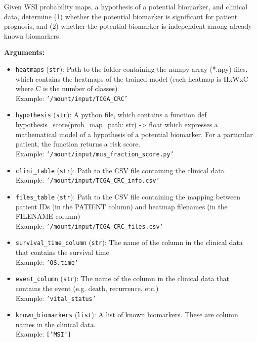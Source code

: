 \begin{tcolorbox}[title={\texttt{pathfinder\_verify\_biomarker}}]
Given WSI probability maps, a hypothesis of a potential biomarker, and clinical data, determine (1) whether the potential biomarker is significant for patient prognosis, and (2) whether the potential biomarker is independent among already known biomarkers.

\vspace{.5em}
\textbf{Arguments:}
\begin{itemize}[topsep=0pt,parsep=-1pt,partopsep=0pt]
\item \texttt{heatmaps} (\texttt{str}): Path to the folder containing the numpy array (\textasciigrave{}*.npy\textasciigrave{}) files, which contains the heatmaps of the trained model (each heatmap is HxWxC where C is the number of classes)\\  Example: \texttt{'/mount/input/TCGA\_CRC'}
\item \texttt{hypothesis} (\texttt{str}): A python file, which contains a function \textasciigrave{}def hypothesis\_score(prob\_map\_path: str) -\textgreater{} float\textasciigrave{} which expresses a mathematical model of a hypothesis of a potential biomarker.  For a particular patient, the function returns a risk score.\\  Example: \texttt{'/mount/input/mus\_fraction\_score.py'}
\item \texttt{clini\_table} (\texttt{str}): Path to the CSV file containing the clinical data\\  Example: \texttt{'/mount/input/TCGA\_CRC\_info.csv'}
\item \texttt{files\_table} (\texttt{str}): Path to the CSV file containing the mapping between patient IDs (in the PATIENT column) and heatmap filenames (in the FILENAME column)\\  Example: \texttt{'/mount/input/TCGA\_CRC\_files.csv'}
\item \texttt{survival\_time\_column} (\texttt{str}): The name of the column in the clinical data that contains the survival time\\  Example: \texttt{'OS.time'}
\item \texttt{event\_column} (\texttt{str}): The name of the column in the clinical data that contains the event (e.g. death, recurrence, etc.)\\  Example: \texttt{'vital\_status'}
\item \texttt{known\_biomarkers} (\texttt{list}): A list of known biomarkers. These are column names in the clinical data.\\  Example: \texttt{['MSI']}
\end{itemize}


\end{tcolorbox}

